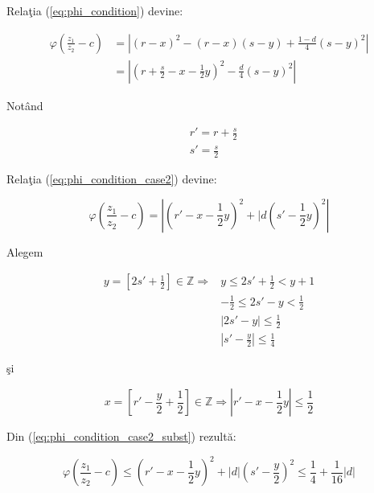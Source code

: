 \documentclass[12t]{article}
\begin{document}
Relaţia (\ref{eq:phi_condition}) devine:

\begin{equation} \label{eq:phi_condition_case2}
\begin{split}
    \varphi \left(\frac{z_1}{z_2} - c\right)  &= \left| (r-x)^2 - (r-x)(s-y) + \frac{1-d}{4}(s-y)^2 \right| \\
    &= \left| \left(r + \frac{s}{2} - x - \frac{1}{2}y\right)^2 - \frac{d}{4}(s-y)^2 \right|
\end{split}
\end{equation}

Notând

\begin{equation}
\begin{split}
    & r' = r + \frac{s}{2} \\
    & s' = \frac{s}{2}
\end{split}
\end{equation}

Relaţia (\ref{eq:phi_condition_case2}) devine:

\begin{equation} \label{eq:phi_condition_case2_subst}
    \varphi \left(\frac{z_1}{z_2} - c\right) =
    \left| \left(r' - x - \frac{1}{2}y \right) ^2  + |d \left(s' - \frac{1}{2}y\right)^2  \right|
\end{equation}

Alegem

\begin{equation}
\begin{split}
    y = \left[ 2s' + \frac{1}{2} \right] \in \mathbb{Z} \Rightarrow & 
    y \leq 2s' + \frac{1}{2} < y + 1 \\
    & -\frac{1}{2} \leq 2s'- y < \frac{1}{2} \\ 
    & \left| 2s' - y \right| \leq \frac{1}{2} \\
    & \boxed{\left| s' - \frac{y}{2} \right| \leq \frac{1}{4}}
\end{split}
\end{equation}

şi

\begin{equation}
    x = \left[ r' - \frac{y}{2} + \frac{1}{2} \right] \in \mathbb{Z} \Rightarrow 
    \boxed{|r' - x - \frac{1}{2}y| \leq \frac{1}{2}}
\end{equation}


Din (\ref{eq:phi_condition_case2_subst}) rezultă:

\begin{equation}
    \varphi \left(\frac{z_1}{z_2} - c\right) \leq
    \left( r'- x - \frac{1}{2}y \right)^2 + |d|\left(s' - \frac{y}{2}\right)^2 \leq \frac{1}{4} + \frac{1}{16}|d|
\end{equation}
\end{document}
